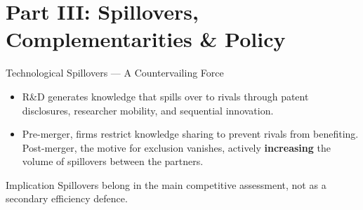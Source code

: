 \documentclass[10pt, aspectratio=169]{beamer}
\begin{document}
\section{Part III: Spillovers, Complementarities \& Policy}


\begin{frame}{Technological Spillovers — A Countervailing Force}
  \begin{itemize}
    \item R\&D generates knowledge that spills over to rivals
          through patent disclosures, researcher mobility,
          and sequential innovation.

    \item Pre-merger, firms restrict knowledge sharing to prevent rivals from benefiting. Post-merger, the motive for exclusion vanishes, actively \textbf{increasing} the volume of spillovers between the partners.
    
  \end{itemize}

  \medskip
  \centering

  \begin{block}{Implication}
    Spillovers belong in the main competitive assessment,
    not as a secondary efficiency defence.
  \end{block}
\end{frame}
\end{document}
